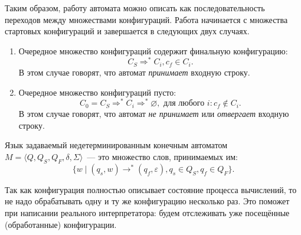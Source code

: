 Таким образом, работу автомата можно описать как последовательность переходов между множествами конфигураций.
Работа начинается с множества стартовых конфигураций и завершается в следующих двух случаях.
\begin{enumerate}
    \item Очередное множество конфигураций содержит финальную конфигурацию:
    \[C_S \Rightarrow^* C_i, c_f \in C_i.\] В этом случае говорят, что автомат \textit{принимает} входную строку.
    \item Очередное множество конфигураций пусто:
    \[C_0 = C_S \Rightarrow^* C_i \Rightarrow^* \varnothing, \text{ для любого } i: c_f \notin C_i.\]
    В этом случае говорят, что автомат \textit{не принимает} или \textit{отвергает} входную строку.
\end{enumerate}

\begin{definition}
    Язык задаваемый недетерминированным конечным автоматом $M = \langle Q, Q_S, Q_F, \delta, \Sigma \rangle$~--- это множество слов, принимаемых им:
     \[ \{w \mid (q_s,w) \to^* (q_f,\varepsilon), q_s \in Q_S, q_f \in Q_F \}.\]
\end{definition}

Так как конфигурация полностью описывает состояние процесса вычислений, то не надо обрабатывать одну и ту же конфигурацию несколько раз.
Это поможет при написании реального интерпретатора: будем отслеживать уже посещённые (обработанные) конфигурации.

